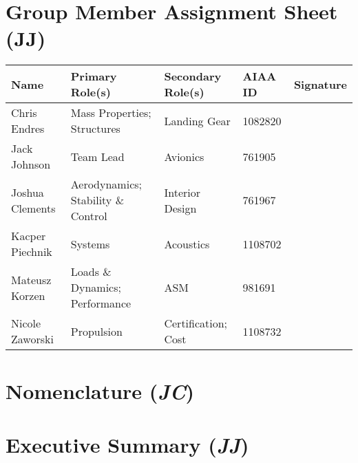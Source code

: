 \documentclass[conf]{new-aiaa}
\begin{document}
\section*{Group Member Assignment Sheet (JJ)}
\begin{center}
    \begin{tabular}{ |p{3cm}||p{3cm}|p{3cm}|p{1.5cm}|p{3cm}| }\toprule
         \textbf{Name} & \textbf{Primary Role(s)} & \textbf{Secondary Role(s)} & \textbf{AIAA ID} & \textbf{Signature} \\\hline
         Chris Endres & Mass Properties; \newline Structures & Landing Gear & 1082820 & \\
         Jack Johnson & Team Lead & Avionics & 761905 & \\ 
         Joshua Clements & Aerodynamics; \newline Stability \& Control & Interior Design & 761967 & \\ 
         Kacper Piechnik & Systems & Acoustics & 1108702 & \\ 
         Mateusz Korzen & Loads \& Dynamics; \newline Performance & ASM & 981691 & \\ 
         Nicole Zaworski & Propulsion & Certification; Cost & 1108732 & \\\bottomrule 
    \end{tabular}
\end{center}

\newpage
\tableofcontents

\newpage

\section*{Nomenclature (\textit{JC})}



\newpage \setcounter{section}{0}
\doublespacing

\section{Executive Summary (\textit{JJ})}

\end{document}
